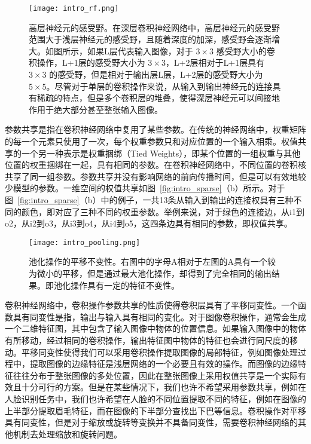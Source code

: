 \begin{figure}
\centering
\texttt{[image: intro\_rf.png]}
\caption{高层神经元的感受野。在深层卷积神经网络中，高层神经元的感受野范围大于浅层神经元的感受野，且随着深度的加深，感受野会逐渐增大。如图所示，如果L层代表输入图像，对于 $3\times3$ 感受野大小的卷积操作，L+1层的感受野大小为 $3\times3$，L+2层相对于L+1层具有 $3\times3$ 的感受野，但是相对于输出层L层，L+2层的感受野大小为 $5\times5$。尽管对于单层的卷积操作来说，从输入到输出神经元的连接具有稀疏的特点，但是多个卷积层的堆叠，使得深层神经元可以间接地作用于绝大部分甚至整张输入图像。}
\label{fig:intro_rf}
\end{figure}

参数共享是指在卷积神经网络中复用了某些参数。在传统的神经网络中，权重矩阵的每一个元素只使用了一次，每个权重参数只和对应位置的一个输入相乘。权值共享的一个另一种表示是权重捆绑（Tied Weights），即某个位置的一组权重与其他位置的权重捆绑在一起，具有相同的参数。在卷积神经网络中，不同位置的卷积核共享了同一组参数。参数共享并没有影响网络的前向传播时间，但是可以有效地较少模型的参数。一维空间的权值共享如图~\ref{fig:intro_sparse}（b）所示。对于图~\ref{fig:intro_sparse}（b）中的例子，一共13条从输入到输出的连接权具有三种不同的颜色，即对应了三种不同的权重参数。举例来说，对于绿色的连接边，从i1到o2，从i2到o3，从i3到o4，从i4到o5，这四条边具有相同的参数，即权值共享。

\begin{figure}
\centering
\texttt{[image: intro\_pooling.png]}
\caption{池化操作的平移不变性。右图中的字母A相对于左图的A具有一个较为微小的平移，但是通过最大池化操作，却得到了完全相同的输出结果。即池化操作具有一定的特征不变性。}
\label{fig:intro_pooling}
\end{figure}

卷积神经网络中，卷积操作参数共享的性质使得卷积层具有了平移同变性。一个函数具有同变性是指，输出与输入具有相同的变化。对于图像卷积操作，通常会生成一个二维特征图，其中包含了输入图像中物体的位置信息。如果输入图像中的物体有所移动，经过相同的卷积操作，输出特征图中物体的特征也会进行同尺度的移动。平移同变性使得我们可以采用卷积操作提取图像的局部特征，例如图像处理过程中，提取图像的边缘特征是浅层网络的一个必要且有效的操作。而图像的边缘特征往往分布于整张图像的多处位置，因此在整张图像上采用权值共享是一个实际有效且十分可行的方案。但是在某些情况下，我们也许不希望采用参数共享，例如在人脸识别任务中，我们也许希望在人脸的不同位置提取不同的特征，例如在图像的上半部分提取眉毛特征，而在图像的下半部分查找出下巴等信息。卷积操作对平移具有同变性，但是对于缩放或旋转等变换并不具备同变性，需要卷积神经网络的其他机制去处理缩放和旋转问题。



